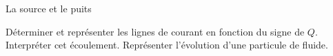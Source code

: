 \begin{exo}[PC][1][TD]{La source et le puits}
\begin{quest}
{}
\item Déterminer et représenter les lignes de courant en fonction du signe de $Q$. Interpréter cet écoulement. Représenter l'évolution d’une particule de fluide.
\end{quest}
\end{exo}


